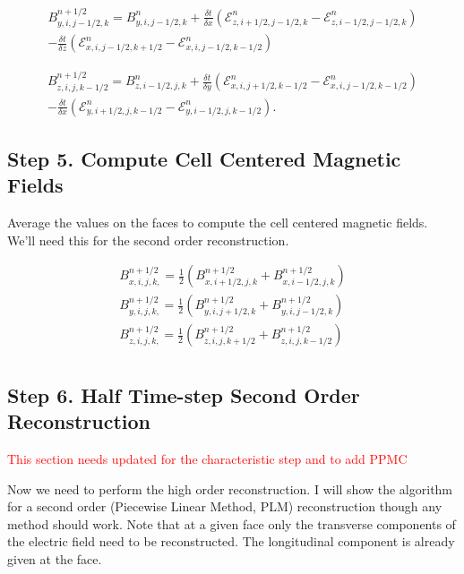 $$
    \begin{aligned}
        B^{n+1/2}_{y,i,j-1/2,k} = B^{n}_{y,i,j-1/2,k}
        + \frac{\delta t}{\delta x} \left( \mathcal{E}^n_{z,i+1/2,j-1/2,k} - \mathcal{E}^n_{z,i-1/2,j-1/2,k} \right) \\
        - \frac{\delta t}{\delta z} \left( \mathcal{E}^n_{x,i,j-1/2,k+1/2} - \mathcal{E}^n_{x,i,j-1/2,k-1/2} \right)
    \end{aligned}
$$

$$
    \begin{aligned}
        B^{n+1/2}_{z,i,j,k-1/2} = B^{n}_{z,i-1/2,j,k}
        + \frac{\delta t}{\delta y} \left( \mathcal{E}^n_{x,i,j+1/2,k-1/2} - \mathcal{E}^n_{x,i,j-1/2,k-1/2} \right) \\
        - \frac{\delta t}{\delta x} \left( \mathcal{E}^n_{y,i+1/2,j,k-1/2} - \mathcal{E}^n_{y,i-1/2,j,k-1/2} \right).
    \end{aligned}
$$

\subsection{Step 5. Compute Cell Centered Magnetic Fields}
\label{vlct:2nd-cell-centered-magnetic-fields}

Average the values on the faces to compute the cell centered magnetic fields.
We'll need this for the second order reconstruction.

$$
    \begin{aligned}
        B^{n+1/2}_{x,i,j,k,} = \frac{1}{2} \left( B^{n+1/2}_{x,i+1/2,j,k} + B^{n+1/2}_{x,i-1/2,j,k} \right) \\
        B^{n+1/2}_{y,i,j,k,} = \frac{1}{2} \left( B^{n+1/2}_{y,i,j+1/2,k} + B^{n+1/2}_{y,i,j-1/2,k} \right) \\
        B^{n+1/2}_{z,i,j,k,} = \frac{1}{2} \left( B^{n+1/2}_{z,i,j,k+1/2} + B^{n+1/2}_{z,i,j,k-1/2} \right) \\
    \end{aligned}
$$

\subsection{Step 6. Half Time-step Second Order Reconstruction}
\label{vlct:higher-order-reconstruction}

\textcolor{red}{This section needs updated for the characteristic step and to add PPMC}

Now we need to perform the high order reconstruction. I will show the algorithm for a second order (Piecewise Linear Method, PLM) reconstruction though any method should work. Note that at a given face only the transverse components of the electric field need to be reconstructed. The longitudinal component is already given at the face.

